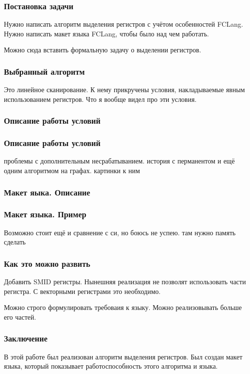 \documentclass[10pt,a4paper]{beamer}
\begin{document}
\begin{frame}
\frametitle{Постановка задачи}
Нужно написать алгоритм выделения регистров с учётом особенностей FCLang.
Нужно написать макет языка FCLang, чтобы было над чем работать.

Можно сюда вставить формальную задачу о выделении регистров.
\end{frame}

\begin{frame}
\frametitle{Выбранный алгоритм}

Это линейное сканирование.
К нему прикручены условия, накладываемые явным использованием регистров.
Что я вообще видел про эти условия.

\end{frame}

\begin{frame}
\frametitle{Описание работы условий}
\end{frame}

\begin{frame}
\frametitle{Описание работы условий}
проблемы с дополнительным несрабатыванием.
история с перманентом и ещё одним алгоритмом на графах.
картинки к ним
\end{frame}

\begin{frame}
\frametitle{Макет яыка. Описание}
\end{frame}

\begin{frame}
\frametitle{Макет языка. Пример}
Возможно стоит ещё и сравнение с си, но боюсь не успею.
там нужно память сделать
\end{frame}

\begin{frame}
\frametitle{Как это можно развить}
Добавить SMID регистры.
Нынешняя реализация не позволят использовать части регистра.
С векторными регистрами это необходимо.

Можно строго формулировать требоваия к языку.
Можно реализовывать больше его частей.
\end{frame}

\begin{frame}
\frametitle{Заключение}
В этой работе был реализован алгоритм выделения регистров.
Был создан макет языка, который показывает работоспособность этого алгоритма и языка.
\end{frame}


\end{document}
